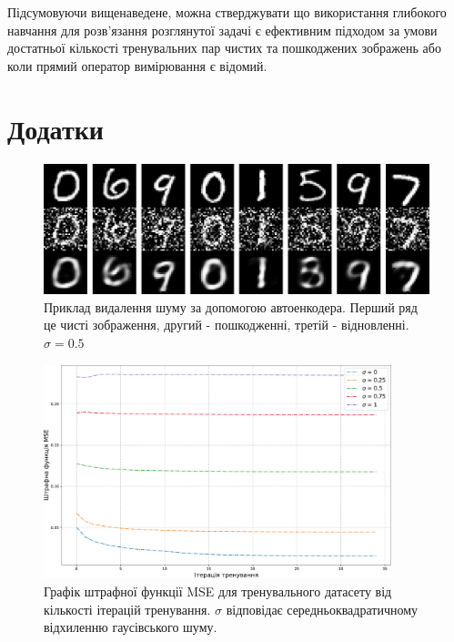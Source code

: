 \documentclass[14pt,a4paper]{extarticle}
\newcounter{e}
\numberwithin{equation}{section}
\numberwithin{figure}{section}
\begin{document}
	Підсумовуючи вищенаведене, можна стверджувати що використання глибокого навчання для розв'язання розглянутої задачі є ефективним підходом за умови достатньої кількості тренувальних пар чистих та пошкоджених зображень або коли прямий оператор вимірювання є відомий. 

	\newpage
	\thispagestyle{empty}
	\section*{Додатки}

	\begin{figure}[H]
		\centering
		\includegraphics[width=1\textwidth]{../resources/autoencoder-denoising-samples.pdf}
		\caption{Приклад видалення шуму за допомогою автоенкодера. Перший ряд це чисті зображення, другий - пошкодженні, третій - відновленні. $\sigma=0.5$}
		\label{fig:autoencoder-denoising-samples}
	\end{figure}	
	
	\begin{figure}[H]
		\centering
		\includegraphics[width=0.9\textwidth]{../resources/awgn-train-loss-comparation.pdf}
		\caption{Графік штрафної функції MSE для тренувального датасету від кількості ітерацій тренування. $\sigma$ відповідає середньоквадратичному відхиленню гаусівського шуму.}
		\label{fig:awgn-loss-ssim-comparation}
	\end{figure}
		

	\newpage
	\thispagestyle{empty}
	\printbibliography[title={Література}]

\end{document}
